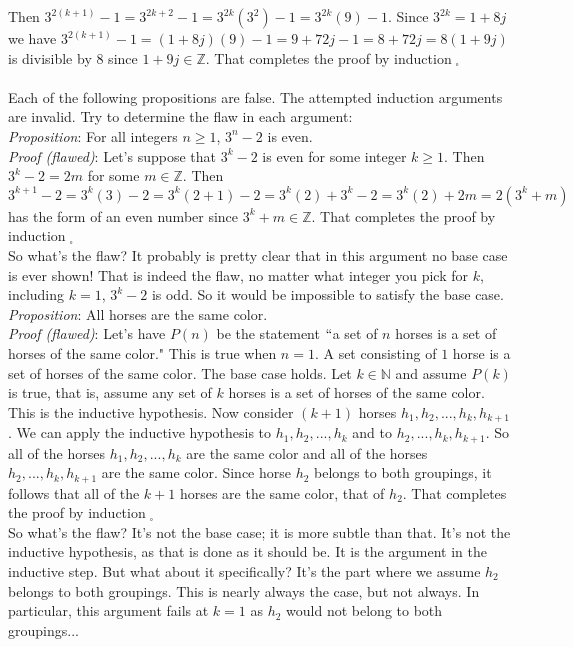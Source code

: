\documentclass[12pt]{amsart}
\theoremstyle{definition}
\theoremstyle{remark}
\newcommand{\nats}{\mathbb N}
\newcommand{\ints}{\mathbb Z}
\begin{document}
Then $3^{2(k+1)}-1=3^{2k+2}-1=3^{2k}(3^2)-1=3^{2k}(9)-1$.  Since $3^{2k}=1+8j$ we have $3^{2(k+1)}-1=(1+8j)(9)-1=9+72j-1=8+72j=8(1+9j)$ is divisible by $8$ since $1+9j\in\ints$.  That completes the proof by induction$\;_{\square}$\\ \\


Each of the following propositions are false.  The attempted induction arguments are invalid.  Try to determine the flaw in each argument:\\

\emph{Proposition}:  For all integers $n\geq 1$, $3^n -2$ is even.\\

\emph{Proof (flawed)}:  Let's suppose that $3^k-2$ is even for some integer $k\geq 1$.  Then $3^k-2=2m$ for some $m\in\ints$.  Then $3^{k+1}-2=3^k(3)-2=3^k(2+1)-2=3^k (2)+3^k-2=3^k (2)+2m=2(3^k+m)$ has the form of an even number since $3^k+m\in\ints$.  That completes the proof by induction$\;_{\square}$\\

So what's the flaw?  It probably is pretty clear that in this argument no base case is ever shown!  That is indeed the flaw, no matter what integer you pick for $k$, including $k=1$, $3^k-2$ is odd.  So it would be impossible to satisfy the base case.\\

\emph{Proposition}:  All horses are the same color.\\

\emph{Proof (flawed)}:  Let's have $P(n)$ be the statement $``$a set of $n$ horses is a set of horses of the same color."  This is true when $n=1$.  A set consisting of $1$ horse is a set of horses of the same color.  The base case holds.  Let $k\in\nats$ and assume $P(k)$ is true, that is, assume any set of $k$ horses is a set of horses of the same color.  This is the inductive hypothesis.  Now consider $(k+1)$ horses $h_1,h_2,...,h_k,h_{k+1}$.  We can apply the inductive hypothesis to $h_1,h_2,...,h_k$ and to $h_2,...,h_k,h_{k+1}$.  So all of the horses $h_1,h_2,...,h_k$ are the same color and all of the horses $h_2,...,h_k,h_{k+1}$ are the same color.  Since horse $h_2$ belongs to both groupings, it follows that all of the $k+1$ horses are the same color, that of $h_2$.  That completes the proof by induction$\;_{\square}$\\

So what's the flaw?  It's not the base case; it is more subtle than that.  It's not the inductive hypothesis, as that is done as it should be.  It is the argument in the inductive step.  But what about it specifically?  It's the part where we assume $h_2$ belongs to both groupings.  This is nearly always the case, but not always.  In particular, this argument fails at $k=1$ as $h_2$ would not belong to both groupings...
\end{document}
